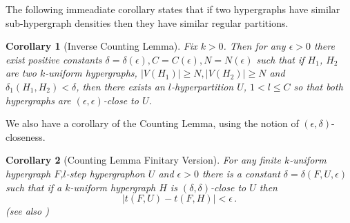 \documentclass [11pt] {article}
\newtheorem{corollary}{Corollary}[section]
\begin{document}
 The following immeadiate corollary states that if two hypergraphs 
have similar 
sub-hypergraph densities then they have similar regular partitions. 
\begin{corollary}[Inverse Counting Lemma]\label{inverse}
Fix $k>0$. Then for any $\epsilon>0$ there exist 
positive constants
$\delta=\delta(\epsilon), C=C(\epsilon), 
N=N(\epsilon)$ such that
if $H_1$, $H_2$ are two $k$-uniform hypergraphs, $|V(H_1)|\geq N, |V(H_2)|\geq
N$ and $\delta_1(H_1,H_2)<\delta$,
 then there exists an $l$-hyperpartition $U$, $1<l\leq C$ so that
both hypergraphs are $(\epsilon,\epsilon)$-close to $U$.
\end{corollary}
We also have a corollary of the Counting Lemma, using the
notion of $(\epsilon, \delta)$-closeness.
\begin{corollary}[Counting Lemma Finitary Version]\label{counting2}
For any finite $k$-uniform hypergraph $F$,$l$-step hypergraphon
$U$ and $\epsilon>0$ there is a constant $\delta=\delta(F,U,\epsilon)$ 
such that if
a $k$-uniform hypergraph $H$ is $(\delta,\delta)$-close to $U$ then
$$|t(F,U)-t(F,H)|<\epsilon\,.$$ (see also \cite{NRS})
\end{corollary}
\end{document}
